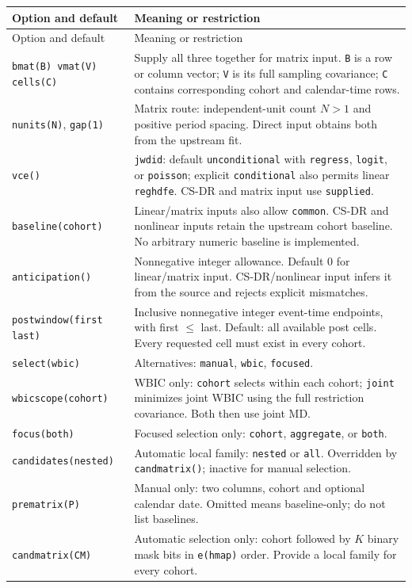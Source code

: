 \documentclass[11pt]{article}
\newcommand{\cmd}[1]{\texttt{#1}}
\begin{document}
{\small
\begin{longtable}{@{}p{.34\linewidth}p{.62\linewidth}@{}}
\toprule
Option and default & Meaning or restriction \\
\midrule
\endfirsthead
\toprule
Option and default & Meaning or restriction \\
\midrule
\endhead
\bottomrule
\endfoot
\cmd{bmat(B) vmat(V) cells(C)} & Supply all three together for matrix input. \cmd{B} is a row or column vector; \cmd{V} is its full sampling covariance; \cmd{C} contains corresponding cohort and calendar-time rows. \\
\cmd{nunits(N)}, \cmd{gap(1)} & Matrix route: independent-unit count $N>1$ and positive period spacing. Direct input obtains both from the upstream fit. \\
\cmd{vce()} & \cmd{jwdid}: default \cmd{unconditional} with \cmd{regress}, \cmd{logit}, or \cmd{poisson}; explicit \cmd{conditional} also permits linear \cmd{reghdfe}. CS-DR and matrix input use \cmd{supplied}. \\
\cmd{baseline(cohort)} & Linear/matrix inputs also allow \cmd{common}. CS-DR and nonlinear inputs retain the upstream cohort baseline. No arbitrary numeric baseline is implemented. \\
\cmd{anticipation()} & Nonnegative integer allowance. Default 0 for linear/matrix input. CS-DR/nonlinear input infers it from the source and rejects explicit mismatches. \\
\cmd{postwindow(first last)} & Inclusive nonnegative integer event-time endpoints, with first $\leq$ last. Default: all available post cells. Every requested cell must exist in every cohort. \\
\cmd{select(wbic)} & Alternatives: \cmd{manual}, \cmd{wbic}, \cmd{focused}. \\
\cmd{wbicscope(cohort)} & WBIC only: \cmd{cohort} selects within each cohort; \cmd{joint} minimizes joint WBIC using the full restriction covariance. Both then use joint MD. \\
\cmd{focus(both)} & Focused selection only: \cmd{cohort}, \cmd{aggregate}, or \cmd{both}. \\
\cmd{candidates(nested)} & Automatic local family: \cmd{nested} or \cmd{all}. Overridden by \cmd{candmatrix()}; inactive for manual selection. \\
\cmd{prematrix(P)} & Manual only: two columns, cohort and optional calendar date. Omitted means baseline-only; do not list baselines. \\
\cmd{candmatrix(CM)} & Automatic selection only: cohort followed by $K$ binary mask bits in \cmd{e(hmap)} order. Provide a local family for every cohort. \\

\end{longtable}}
\end{document}
